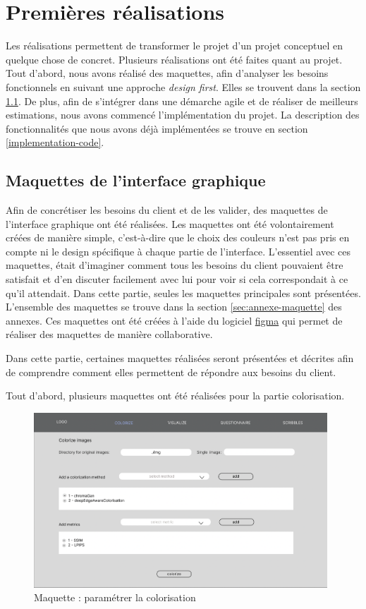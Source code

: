\documentclass{article}
\begin{document}
\section{Premières réalisations}

Les réalisations permettent de transformer le projet d'un projet conceptuel en quelque chose de concret.
Plusieurs réalisations ont été faites quant au projet. Tout d'abord, nous avons réalisé des maquettes, afin d'analyser
les besoins fonctionnels en suivant une approche \textit{design first}. Elles se trouvent dans la section \ref{sec:maquette}.
De plus, afin de s'intégrer dans une démarche agile et de réaliser de meilleurs estimations, nous avons commencé l'implémentation
du projet. La description des fonctionnalités que nous avons déjà implémentées se trouve en section \ref{implementation-code}.

\subsection{Maquettes de l'interface graphique}\label{sec:maquette}

Afin de concrétiser les besoins du client et de les valider, des maquettes de l'interface graphique ont été réalisées.
Les maquettes ont été volontairement créées de manière simple, c'est-à-dire que le choix des couleurs n'est pas pris en compte
ni le design spécifique à chaque partie de l'interface.
L'essentiel avec ces maquettes, était d'imaginer comment tous les besoins du client pouvaient être satisfait
et d'en discuter facilement avec lui pour voir si cela correspondait à ce qu'il attendait. Dans cette partie, seules les maquettes principales sont présentées.
L'ensemble des maquettes se trouve dans la section \ref{sec:annexe-maquette} des annexes.
Ces maquettes ont été créées à l'aide du logiciel \href{https://www.figma.com/}{figma} qui permet de réaliser des maquettes de manière collaborative.

Dans cette partie, certaines maquettes réalisées seront présentées et décrites afin de comprendre comment
elles permettent de répondre aux besoins du client. 

Tout d'abord, plusieurs maquettes ont été réalisées pour la partie colorisation.

\begin{figure}[!ht]
    \centering
    \includegraphics[width=11cm]{coloriser-parametrage1.png}
    \caption{Maquette : paramétrer la colorisation}
    \label{fig:coloriser-parametrage1}
\end{figure}
\end{document}
